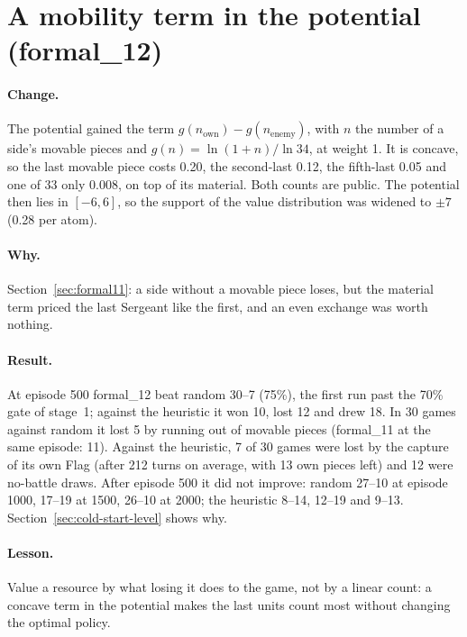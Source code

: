 \section{A mobility term in the potential (formal\_12)}
\label{sec:formal12}

\paragraph{Change.} The potential gained the term $g(n_{\mathrm{own}}) - g(n_{\mathrm{enemy}})$, with
$n$ the number of a side's movable pieces and $g(n) = \ln(1+n)/\ln 34$, at weight 1. It is concave,
so the last movable piece costs 0.20, the second-last 0.12, the fifth-last 0.05 and one of 33 only
0.008, on top of its material. Both counts are public. The potential then lies in $[-6, 6]$, so the
support of the value distribution was widened to $\pm 7$ (0.28 per atom).

\paragraph{Why.} Section~\ref{sec:formal11}: a side without a movable piece loses, but the material
term priced the last Sergeant like the first, and an even exchange was worth nothing.

\paragraph{Result.} At episode 500 formal\_12 beat random 30--7 (75\%), the first run past the 70\%
gate of stage~1; against the heuristic it won 10, lost 12 and drew 18. In 30 games against random it lost 5 by
running out of movable pieces (formal\_11 at the same episode: 11). Against the heuristic, 7 of 30
games were lost by the capture of its own Flag (after 212 turns on average, with 13 own pieces left)
and 12 were no-battle draws. After episode 500 it did not improve: random 27--10 at episode 1000,
17--19 at 1500, 26--10 at 2000; the heuristic 8--14, 12--19 and 9--13. Section~\ref{sec:cold-start-level}
shows why.

\paragraph{Lesson.} Value a resource by what losing it does to the game, not by a linear count: a
concave term in the potential makes the last units count most without changing the optimal policy.

